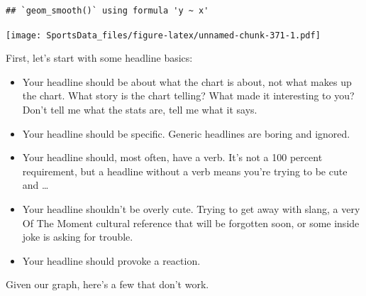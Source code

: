\documentclass[
]{book}
\providecommand{\tightlist}{%
  \setlength{\itemsep}{0pt}\setlength{\parskip}{0pt}}
\begin{document}
\begin{verbatim}
## `geom_smooth()` using formula 'y ~ x'
\end{verbatim}

\texttt{[image: SportsData\_files/figure-latex/unnamed-chunk-371-1.pdf]}

First, let's start with some headline basics:

\begin{itemize}
\tightlist
\item
  Your headline should be about what the chart is about, not what makes up the chart. What story is the chart telling? What made it interesting to you? Don't tell me what the stats are, tell me what it says.
\item
  Your headline should be specific. Generic headlines are boring and ignored.
\item
  Your headline should, most often, have a verb. It's not a 100 percent requirement, but a headline without a verb means you're trying to be cute and \ldots{}
\item
  Your headline shouldn't be overly cute. Trying to get away with slang, a very Of The Moment cultural reference that will be forgotten soon, or some inside joke is asking for trouble.
\item
  Your headline should provoke a reaction.
\end{itemize}

Given our graph, here's a few that don't work.
\end{document}
